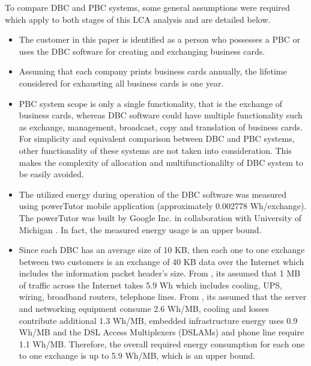 \documentclass[conference]{IEEEtran}
\begin{document}
To compare DBC and PBC systems, some general assumptions were required which apply to both stages of this LCA analysis and are detailed below.

\begin{itemize}
\item The customer in this paper is identified as a person who possesses a PBC or uses the DBC software for creating and exchanging business cards.
\item Assuming that each company prints business cards annually, the lifetime considered for exhausting all business cards is one year.
\item PBC system scope is only a single functionality, that is the exchange of business cards, whereas DBC software could have multiple functionality such as exchange, management, broadcast, copy and translation of business cards. For simplicity and equivalent comparison between DBC and PBC systems, other functionality of these systems are not taken into consideration. This makes the complexity of allocation and multifunctionalilty of DBC system to be easily avoided.
\item The utilized energy during operation of the DBC software was measured using powerTutor mobile application (approximately 0.002778 Wh/exchange). The powerTutor was built by Google Inc. in collaboration with University of Michigan \cite{zhang2010accurate}. In fact, the measured energy usage is an upper bound.

 \item Since each DBC has an average size of 10 KB, then each one to one exchange between two customers is an exchange of 40 KB data over the Internet which includes the information packet header's size. From \cite{Moshnyaga:2013}, its assumed that 1 MB of traffic across the Internet takes 5.9 Wh which includes cooling, UPS, wiring, broadband routers, telephone lines. From \cite{EnergyDownload}, its assumed that the server and networking equipment consume 2.6 Wh/MB, cooling and losses contribute additional 1.3 Wh/MB, embedded infrastructure energy uses 0.9 Wh/MB and the DSL Access Multiplexers (DSLAMs) and phone line require 1.1 Wh/MB. Therefore, the overall required energy consumption for each one to one exchange is up to 5.9 Wh/MB,  which is an upper bound.

\end{itemize}
\end{document}

